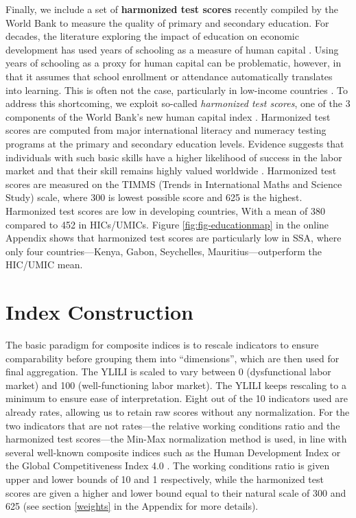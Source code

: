 \documentclass[
  a4paper, twoside, 12pt]{book}
\begin{document}
Finally, we include a set of \textbf{harmonized test scores} recently compiled by the World Bank to measure the quality of primary and secondary education. For decades, the literature exploring the impact of education on economic development has used years of schooling as a measure of human capital \autocites[e.g.][]{barro1991}[among others]{mankiw1992}. Using years of schooling as a proxy for human capital can be problematic, however, in that it assumes that school enrollment or attendance automatically translates into learning. This is often not the case, particularly in low-income countries \autocite{worldbank2018}. To address this shortcoming, we exploit so-called \emph{harmonized test scores}, one of the 3 components of the World Bank's new human capital index \autocite{angrist2019,kraay2018}. Harmonized test scores are computed from major international literacy and numeracy testing programs at the primary and secondary education levels. Evidence suggests that individuals with such basic skills have a higher likelihood of success in the labor market and that their skill remains highly valued worldwide \autocite{vignoles2020}. Harmonized test scores are measured on the TIMMS (Trends in International Maths and Science Study) scale, where 300 is lowest possible score and 625 is the highest. Harmonized test scores are low in developing countries, With a mean of 380 compared to 452 in HICs/UMICs. Figure \ref{fig:fig-educationmap} in the online Appendix shows that harmonized test scores are particularly low in SSA, where only four countries---Kenya, Gabon, Seychelles, Mauritius---outperform the HIC/UMIC mean.

\hypertarget{methods}{%
\section{Index Construction}\label{methods}}

The basic paradigm for composite indices is to rescale indicators to ensure comparability before grouping them into ``dimensions'', which are then used for final aggregation. The YLILI is scaled to vary between 0 (dysfunctional labor market) and 100 (well-functioning labor market). The YLILI keeps rescaling to a minimum to ensure ease of interpretation. Eight out of the 10 indicators used are already rates, allowing us to retain raw scores without any normalization. For the two indicators that are not rates---the relative working conditions ratio and the harmonized test scores---the Min-Max normalization method is used, in line with several well-known composite indices such as the Human Development Index or the Global Competitiveness Index 4.0 \autocite{decancq2013,oecd2008}. The working conditions ratio is given upper and lower bounds of 10 and 1 respectively, while the harmonized test scores are given a higher and lower bound equal to their natural scale of 300 and 625 (see section \ref{weights} in the Appendix for more details).
\end{document}
